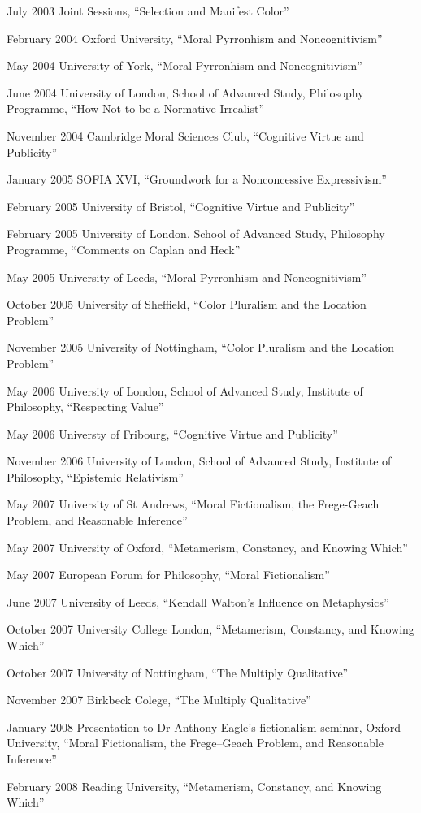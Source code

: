 \documentclass[contbibnum]{cv}
\newcommand\ucl{University College London}
\begin{document}
\begin{topic}
    \item[July 2003] Joint Sessions, ``Selection and Manifest Color''
    \item[February 2004] Oxford University, ``Moral Pyrronhism and Noncognitivism''
    \item[May 2004] University of York, ``Moral Pyrronhism and Noncognitivism''
    \item[June 2004] University of London, School of Advanced Study, Philosophy Programme, ``How Not to be a Normative Irrealist''
    \item[November 2004] Cambridge Moral Sciences Club, ``Cognitive Virtue and Publicity''
    \item[January 2005] SOFIA XVI, ``Groundwork for a Nonconcessive Expressivism''
    \item[February 2005] University of Bristol, ``Cognitive Virtue and Publicity''
    \item[February 2005] University of London, School of Advanced Study, Philosophy Programme, ``Comments on Caplan and Heck''
    \item[May 2005] University of Leeds, ``Moral Pyrronhism and Noncognitivism''
    \item[October 2005] University of Sheffield, ``Color Pluralism and the Location Problem''
    \item[November 2005] University of Nottingham, ``Color Pluralism and the Location Problem''
    \item[May 2006] University of London, School of Advanced Study, Institute of Philosophy, ``Respecting Value''
    \item[May 2006] Universty of Fribourg, ``Cognitive Virtue and Publicity''
    \item[November 2006] University of London, School of Advanced Study, Institute of Philosophy, ``Epistemic Relativism''
    \item[May 2007] University of St Andrews, ``Moral Fictionalism, the Frege-Geach Problem, and Reasonable Inference''
    \item[May 2007] University of Oxford, ``Metamerism, Constancy, and Knowing Which''
    \item[May 2007] European Forum for Philosophy, ``Moral Fictionalism''
    \item[June 2007] University of Leeds, ``Kendall Walton's Influence on Metaphysics''
    \item [October 2007] \ucl, ``Metamerism, Constancy, and Knowing Which''
    \item[October 2007] University of Nottingham, ``The Multiply Qualitative''
    \item[November 2007] Birkbeck Colege, ``The Multiply Qualitative''
    \item[January 2008] Presentation to Dr Anthony Eagle's fictionalism seminar, Oxford University, ``Moral Fictionalism, the Frege--Geach Problem, and Reasonable Inference''
    \item[February 2008] Reading University, ``Metamerism, Constancy, and Knowing Which''
\end{topic}
\end{document}
